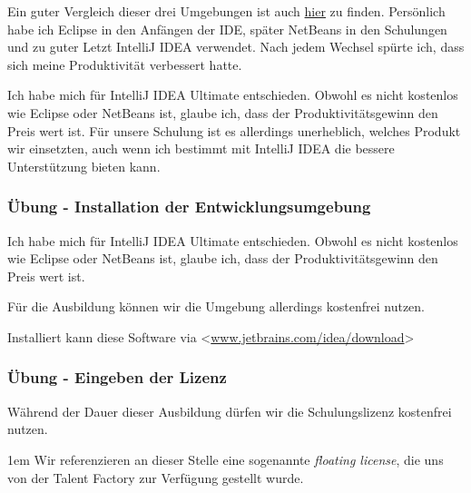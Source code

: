 Ein guter Vergleich dieser drei Umgebungen ist auch
\href{https://www.javaworld.com/article/3114167/development-tools/choosing-your-java-ide.html}
{hier} zu finden. Persönlich habe ich Eclipse in den Anfängen der IDE, später
NetBeans in den Schulungen und zu guter Letzt IntelliJ IDEA verwendet. Nach
jedem Wechsel spürte ich, dass sich meine Produktivität verbessert hatte.

Ich habe mich für IntelliJ IDEA Ultimate entschieden. Obwohl es nicht kostenlos
wie Eclipse oder NetBeans ist, glaube ich, dass der Produktivitätsgewinn den
Preis wert ist. Für unsere Schulung ist es allerdings unerheblich, welches
Produkt wir einsetzten, auch wenn ich bestimmt mit IntelliJ IDEA die bessere
Unterstützung bieten kann.


\begin{frame}[fragile]
    \frametitle<presentation>{Übung - Installation der Entwicklungsumgebung}

    Ich habe mich für IntelliJ IDEA Ultimate entschieden. Obwohl es nicht kostenlos
    wie Eclipse oder NetBeans ist, glaube ich, dass der Produktivitätsgewinn den
    Preis wert ist.

    Für die Ausbildung können wir die Umgebung allerdings kostenfrei nutzen.

    Installiert kann diese Software via <\href{https://www.jetbrains.com/idea/download}
    {www.jetbrains.com/idea/download}>

\end{frame}

\begin{frame}[fragile]
    \frametitle<presentation>{Übung - Eingeben der Lizenz}

    \begin{minipage}[b]{0.5\textwidth}
    \end{minipage}
    \begin{minipage}[b]{0.4\textwidth}
        Während der Dauer dieser Ausbildung dürfen wir die Schulungslizenz
        kostenfrei nutzen.

        \parskip1em
        Wir referenzieren an dieser Stelle eine sogenannte {\em floating license},
        die uns von der Talent Factory zur Verfügung gestellt wurde.
    \end{minipage}

\end{frame}


